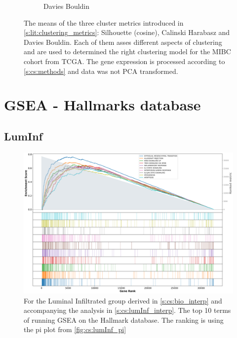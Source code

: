 \begin{figure}[!h]
\begin{subfigure}[!t]{0.6\textwidth}
        \caption{Davies Bouldin}
        \label{fig:ap:dav_boul}
    \end{subfigure}
    \caption{The means of the three cluster metrics introduced in \cref{s:lit:clustering_metrics}: Silhouette (cosine), Calinski Harabasz and Davies Bouldin. Each of them asses different aspects of clustering and are used to determined the right clustering model for the MIBC cohort from TCGA. The gene expression is processed according to \cref{s:cs:methods} and data was not PCA transformed.}
    \label{fig:ap:non_pca_metrics}
\end{figure}


\section{GSEA - Hallmarks database} \label{s:ap:cs:gsea_ne}

\subsection{LumInf}

\begin{figure}[H]    
    \centering
\includegraphics[width=1.0\textwidth,keepaspectratio]{Sections/ClusteringAnalysis/Resources/discussion/other_groups/lumInf_hallmark_10_top.png}
    \caption{For the Luminal Infiltrated group derived in \cref{s:cs:bio_interp} and accompanying the analysis in \cref{s:cs:lumInf_interp}. The top 10 terms of running GSEA on the Hallmark database. The ranking is using the pi plot from \cref{fig:cs:lumInf_pi}}
    \label{fig:ap:cs:gsea_lumInf_hallmark}
\end{figure}


